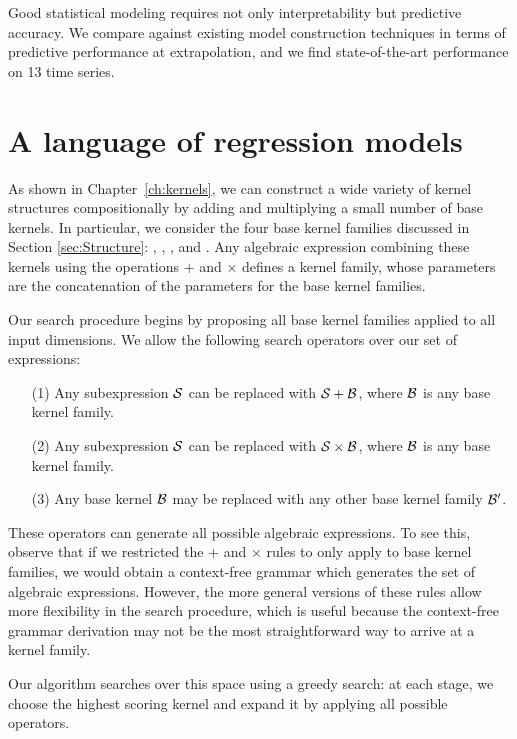 Good statistical modeling requires not only interpretability but predictive accuracy.
We compare \procedurename{} against existing model construction techniques in terms of predictive performance at extrapolation, and we find state-of-the-art performance on 13 time series.





\section{A language of regression models}
\label{sec:improvements}



As shown in Chapter~\ref{ch:kernels}, we can construct a wide variety of kernel structures compositionally by adding and multiplying a small number of base kernels.
In particular, we consider the four base kernel families discussed in Section \ref{sec:Structure}: \kSE, \kPer, \kLin, and \kRQ.
Any algebraic expression combining these kernels using the operations $+$ and $\times$ defines a kernel family, whose parameters are the concatenation of the parameters for the base kernel families. 

Our search procedure begins by proposing all base kernel families applied to all input dimensions. 
We allow the following search operators over our set of expressions:
\begin{itemize}
\item[(1)] Any subexpression ${\cal S}$ can be replaced with ${\cal S} + {\cal B}$, where ${\cal B}$ is any base kernel family.
\item[(2)] Any subexpression ${\cal S}$ can be replaced with ${\cal S} \times {\cal B}$, where ${\cal B}$ is any base kernel family.
\item[(3)] Any base kernel ${\cal B}$ may be replaced with any other base kernel family ${\cal B}^\prime$.
\end{itemize}

These operators can generate all possible algebraic expressions.
To see this, observe that if we restricted the $+$ and $\times$ rules to only apply to base kernel families, we would obtain a context-free grammar which generates the set of algebraic expressions.
However, the more general versions of these rules allow more flexibility in the search procedure, which is useful because the context-free grammar derivation may not be the most straightforward way to arrive at a kernel family.

Our algorithm searches over this space using a greedy search: at each stage, we choose the highest scoring kernel and expand it by applying all possible operators.


